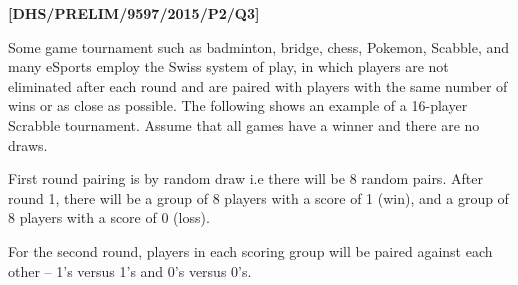 \item \textbf{{[}DHS/PRELIM/9597/2015/P2/Q3{]} }

Some game tournament such as badminton, bridge, chess, Pokemon, Scabble,
and many eSports employ the Swiss system of play, in which players
are not eliminated after each round and are paired with players with
the same number of wins or as close as possible. The following shows
an example of a 16-player Scrabble tournament. Assume that all games
have a winner and there are no draws. 

First round pairing is by random draw i.e there will be 8 random pairs.
After round 1, there will be a group of 8 players with a score of
1 (win), and a group of 8 players with a score of 0 (loss). 

For the second round, players in each scoring group will be paired
against each other -- 1\textquoteright s versus 1\textquoteright s
and 0\textquoteright s versus 0\textquoteright s.

